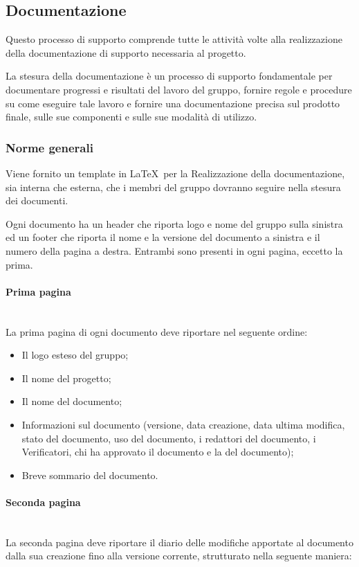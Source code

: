 \subsection{Documentazione}
Questo processo di supporto comprende tutte le attivit\`{a} volte alla realizzazione della documentazione di supporto necessaria al progetto.


La stesura della documentazione è un processo di supporto fondamentale per documentare progressi e risultati del lavoro del gruppo, fornire regole e procedure su come eseguire tale lavoro e fornire una documentazione precisa sul prodotto finale, sulle sue componenti e sulle sue modalità di utilizzo.
\subsubsection{Norme generali}


Viene fornito un template in \LaTeX\ per la Realizzazione della documentazione, sia interna che esterna, che i membri del gruppo dovranno seguire nella stesura dei documenti.

Ogni documento ha un header che riporta logo e nome del gruppo sulla sinistra ed un footer che riporta il nome e la versione del documento a sinistra e il numero della pagina a destra. Entrambi sono presenti in ogni pagina, eccetto la prima.

\paragraph{Prima pagina} \hfill \\
\label{5.2.3}
La prima pagina di ogni documento deve riportare nel seguente ordine:
\begin{itemize}
\item Il logo esteso del gruppo;
\item Il nome del progetto;
\item Il nome del documento;
\item Informazioni sul documento (versione, data creazione, data ultima modifica, stato del documento, uso del documento, i redattori del documento, i Verificatori, chi ha approvato il documento e la  del documento);
\item Breve sommario del documento.
\end{itemize}

\paragraph{Seconda pagina} \hfill \\
\label{5.2.4}
La seconda pagina deve riportare il diario delle modifiche apportate al documento dalla sua creazione fino alla versione corrente, strutturato nella seguente maniera:

